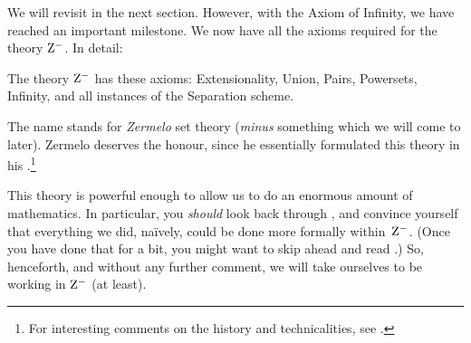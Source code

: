 \documentclass[../../../include/open-logic-section]{subfiles}
\begin{document}

We will revisit \stagesinf{} in the next section. However, with the
Axiom of Infinity, we have reached an important milestone. We now have
all the axioms required for the theory $\mathrm{Z}^{-}$. In detail:

\begin{defn}
The theory $\mathrm{Z}^{-}$ has these axioms: Extensionality, Union, Pairs, Powersets, Infinity, and all instances of the Separation scheme.
\end{defn}

The name stands for \emph{Zermelo} set theory (\emph{minus} something
which we will come to later). Zermelo deserves the honour, since he
essentially formulated this theory in his
\citeyear{Zermelo1908Untersuchungen}.\footnote{For interesting
comments on the history and technicalities, see \citet[Appendix
A]{Potter2004}.}

This theory is powerful enough to allow us to do an enormous amount of
mathematics. In particular, you \emph{should} look back through
, and convince yourself that everything we did,
na\"ively, could be done more formally within~$\mathrm{Z}^{-}$. (Once you
have done that for a bit, you might want to skip ahead and read
.) So, henceforth,
and without any further comment, we will take ourselves to be working
in $\mathrm{Z}^{-}$ (at least).
\end{document}
